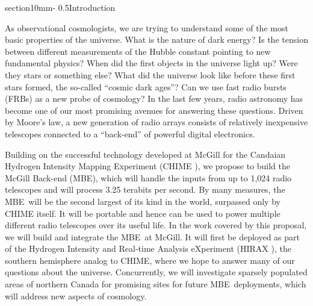 \documentclass[letterpaper,11pt,preprint]{aastex}
\makeatletter
\newcommand{\mbe}{{\rm MBE}}
\renewcommand{\section}{\@startsection%
{section}{1}{0mm}{-\baselineskip}%
{0.5\baselineskip}{\normalfont\Large\bfseries}}%
\makeatother
\begin{document}
\pagestyle{plain}

\section{Introduction}



As observational cosmologists, we are trying to understand some of the
most basic properties of the universe.  What is the nature of dark
energy?  Is the tension between different measurements of the Hubble
constant pointing to new fundamental physics?  When did the first
objects in the universe light up?  Were they stars or something else?
What did the universe look like before these first stars formed, the
so-called ``cosmic dark ages''?  Can we use fast radio bursts (FRBs)
as a new probe of cosmology?  In the last few years, radio astronomy
has become one of our most promising avenues for answering these
questions.  Driven by Moore's law, a new generation of radio arrays
consists of relatively inexpensive telescopes connected to a
``back-end'' of powerful digital electronics.  

Building on the successful technology developed at McGill for the
Candaian Hydrogen Intensity Mapping Experiment (CHIME
\citet{Bandura16}), we propose to build the McGill Back-end (\mbe),
which will handle the inputs from up to 1,024 radio telescopes and
will process 3.25 terabits per second.  By many measures, the \mbe\
will be the second largest of its kind in the world, surpassed only by
CHIME itself.  It will be portable and hence can be used to power
multiple different radio telescopes over its useful life. In the work
covered by this proposal, we will build and integrate the \mbe\ at
McGill.  It will first be deployed as part of the Hydrogen Intensity
and Real-time Analysis eXperiment (HIRAX \citet{Newburgh16}), the
southern hemisphere analog to CHIME, where we hope to answer many of
our questions about the universe.  Concurrently, we will investigate
sparsely populated areas of northern Canada for promising sites for
future \mbe\ deployments, which will address new aspects of cosmology.
\end{document}
